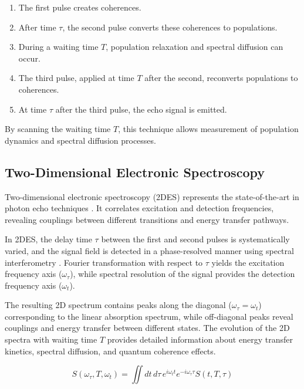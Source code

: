 \begin{enumerate}
    \item The first pulse creates coherences.
    \item After time $\tau$, the second pulse converts these coherences to populations.
    \item During a waiting time $T$, population relaxation and spectral diffusion can occur.
    \item The third pulse, applied at time $T$ after the second, reconverts populations to coherences.
    \item At time $\tau$ after the third pulse, the echo signal is emitted.
\end{enumerate}

\noindent By scanning the waiting time $T$, this technique allows measurement of population dynamics and spectral diffusion processes.

\subsection{Two-Dimensional Electronic Spectroscopy}
\label{subsec:2d_spectroscopy}

\noindent Two-dimensional electronic spectroscopy (2DES) represents the state-of-the-art in photon echo techniques \cite{Jonas2003, Brixner2005, Schlau-Cohen2011}. It correlates excitation and detection frequencies, revealing couplings between different transitions and energy transfer pathways.

\noindent In 2DES, the delay time $\tau$ between the first and second pulses is systematically varied, and the signal field is detected in a phase-resolved manner using spectral interferometry \cite{Lepetit1995, Bristow2011}. Fourier transformation with respect to $\tau$ yields the excitation frequency axis ($\omega_\tau$), while spectral resolution of the signal provides the detection frequency axis ($\omega_t$).

\noindent The resulting 2D spectrum contains peaks along the diagonal ($\omega_\tau = \omega_t$) corresponding to the linear absorption spectrum, while off-diagonal peaks reveal couplings and energy transfer between different states. The evolution of the 2D spectra with waiting time $T$ provides detailed information about energy transfer kinetics, spectral diffusion, and quantum coherence effects.

\begin{equation}
    S(\omega_\tau, T, \omega_t) = \iint dt\, d\tau\, e^{i\omega_t t} e^{-i\omega_\tau \tau} S(t, T, \tau)
    \label{eq:2des_signal}
\end{equation}

